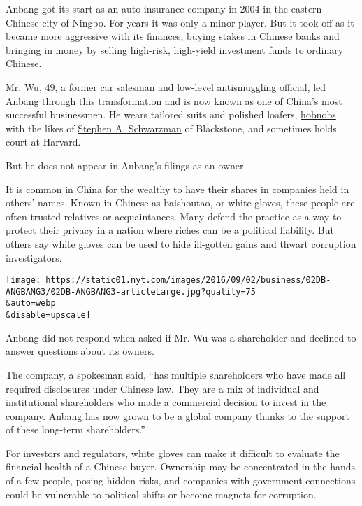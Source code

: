 Anbang got its start as an auto insurance company in 2004 in the eastern
Chinese city of Ningbo. For years it was only a minor player. But it
took off as it became more aggressive with its finances, buying stakes
in Chinese banks and bringing in money by selling
\href{http://www.nytimes.com/2016/08/13/business/international/murky-investments-pose-china-risk.html}{high-risk,
high-yield investment funds} to ordinary Chinese.

Mr. Wu, 49, a former car salesman and low-level antismuggling official,
led Anbang through this transformation and is now known as one of
China's most successful businessmen. He wears tailored suits and
polished loafers,
\href{http://www.anbanggroup.com/abic/english/news_detail29.html}{hobnobs}
with the likes of
\href{http://www.nytimes.com/topic/person/stephen-a-schwarzman}{Stephen
A. Schwarzman} of Blackstone, and sometimes holds court at Harvard.

But he does not appear in Anbang's filings as an owner.

It is common in China for the wealthy to have their shares in companies
held in others' names. Known in Chinese as baishoutao, or white gloves,
these people are often trusted relatives or acquaintances. Many defend
the practice as a way to protect their privacy in a nation where riches
can be a political liability. But others say white gloves can be used to
hide ill-gotten gains and thwart corruption investigators.

\texttt{[image: https://static01.nyt.com/images/2016/09/02/business/02DB-ANGBANG3/02DB-ANGBANG3-articleLarge.jpg?quality=75\\\&auto=webp\\\&disable=upscale]}

Anbang did not respond when asked if Mr. Wu was a shareholder and
declined to answer questions about its owners.

The company, a spokesman said, ``has multiple shareholders who have made
all required disclosures under Chinese law. They are a mix of individual
and institutional shareholders who made a commercial decision to invest
in the company. Anbang has now grown to be a global company thanks to
the support of these long-term shareholders.''

For investors and regulators, white gloves can make it difficult to
evaluate the financial health of a Chinese buyer. Ownership may be
concentrated in the hands of a few people, posing hidden risks, and
companies with government connections could be vulnerable to political
shifts or become magnets for corruption.

